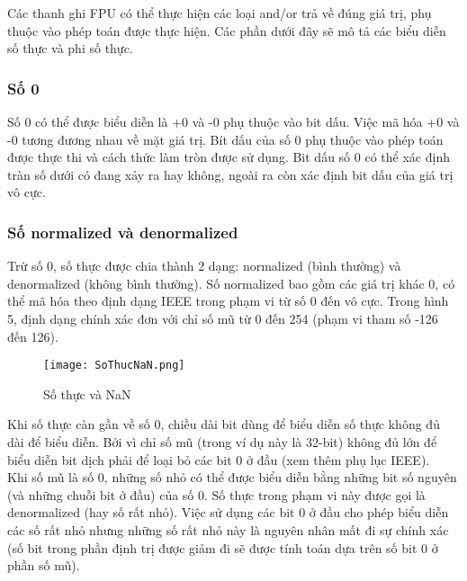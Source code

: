 		Các thanh ghi FPU có thể thực hiện các loại and/or trả về đúng giá trị, phụ thuộc vào phép toán được thực hiện. Các phần dưới đây sẽ mô tả các biểu diễn số thực và phi số thực.
		
		\subsubsection*{Số 0}
		Số 0 có thể được biểu diễn là +0 và  -0 phụ thuộc vào bit dấu. Việc mã hóa +0 và -0 tương đương nhau về mặt giá trị. Bít dấu của số 0 phụ thuộc vào phép toán được thực thi và cách thức làm tròn được sử dụng. Bit dấu số 0 có thể xác định tràn số dưới có đang xảy ra hay không, ngoài ra còn xác định bit dấu của giá trị vô cực. 
		
		\subsubsection*{Số normalized và denormalized}
		Trừ số 0, số thực được chia thành 2 dạng: normalized (bình thường) và denormalized (không bình thường). Số normalized bao gồm các giá trị khác 0, có thể mã hóa theo định dạng IEEE trong phạm vi từ số 0 đến vô cực. Trong hình 5, định dạng chính xác đơn với chỉ số mũ từ 0 đến 254 (phạm vi tham số -126 đến 126).
		\begin{center}
			\begin{figure}[htp]
				\begin{center}
					\texttt{[image: SoThucNaN.png]}
				\end{center}
				\caption{Số thực và NaN}				
				\label{fig:SothucNaN}
			\end{figure}
		\end{center}		

	Khi số thực càn gần về số 0, chiều dài bit dùng để biểu diễn số thực không đủ dài để biểu diễn. Bởi vì chỉ số mũ (trong ví dụ này là 32-bit) không đủ lớn để biểu diễn bit dịch phải để loại bỏ các bit 0 ở đầu (xem thêm phụ lục IEEE).\\

	Khi số mũ là số 0, những số nhỏ có thể được biểu diễn bằng những bit số nguyên (và những chuỗi bit ở đầu) của số 0. Số thực trong phạm vi này được gọi là denormalized (hay số rất nhỏ). Việc sử dụng các bit 0 ở đầu cho phép biểu diễn các số rất nhỏ nhưng những số rất nhỏ này là nguyên nhân mất đi sự chính xác (số bit trong phần định trị được giảm đi sẽ được tính toán dựa trên số bit 0 ở phần số mũ).\\

